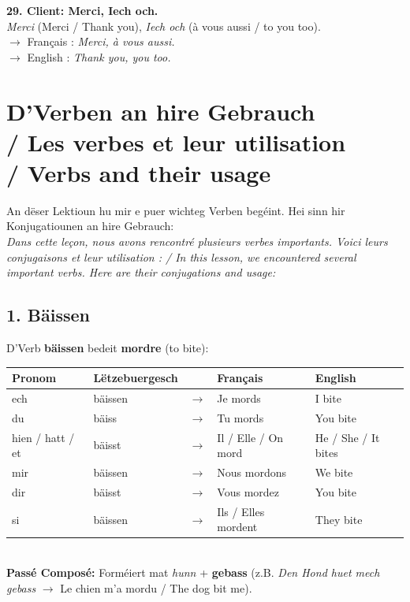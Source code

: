 \noindent\textbf{29. Client: Merci, Iech och.}\\
\textit{Merci} (Merci / Thank you), \textit{Iech och} (à vous aussi / to you too).\\
$\rightarrow$ Français : \textit{Merci, à vous aussi.}\\
$\rightarrow$ English : \textit{Thank you, you too.}\\[0.5em]

\vspace{1cm}

\section[D'Verben an hire Gebrauch / Verbes / Verbs]{D'Verben an hire Gebrauch \\/ Les verbes et leur utilisation \\/ Verbs and their usage}

An dëser Lektioun hu mir e puer wichteg Verben begéint. Hei sinn hir Konjugatiounen an hire Gebrauch: \\
\textit{Dans cette leçon, nous avons rencontré plusieurs verbes importants. Voici leurs conjugaisons et leur utilisation : / In this lesson, we encountered several important verbs. Here are their conjugations and usage:}

\subsection*{1. Bäissen}
D'Verb \textbf{bäissen} bedeit \textbf{mordre} (to bite):

\begin{tabular}{ll c l l}
    \toprule
    \textbf{Pronom} & \textbf{Lëtzebuergesch} & \textbf{} & \textbf{Français} & \textbf{English} \\
    \midrule
    ech & bäissen & $\rightarrow$ & Je mords & I bite \\
    du & bäiss & $\rightarrow$ & Tu mords & You bite \\
    hien / hatt / et & bäisst & $\rightarrow$ & Il / Elle / On mord & He / She / It bites \\
    \midrule
    mir & bäissen & $\rightarrow$ & Nous mordons & We bite \\
    dir & bäisst & $\rightarrow$ & Vous mordez & You bite \\
    si & bäissen & $\rightarrow$ & Ils / Elles mordent & They bite \\
    \bottomrule
\end{tabular}
\\[0.5em]
\textbf{Passé Composé:} Forméiert mat \textit{hunn} + \textbf{gebass} (z.B. \textit{Den Hond huet mech gebass} $\rightarrow$ Le chien m'a mordu / The dog bit me).

